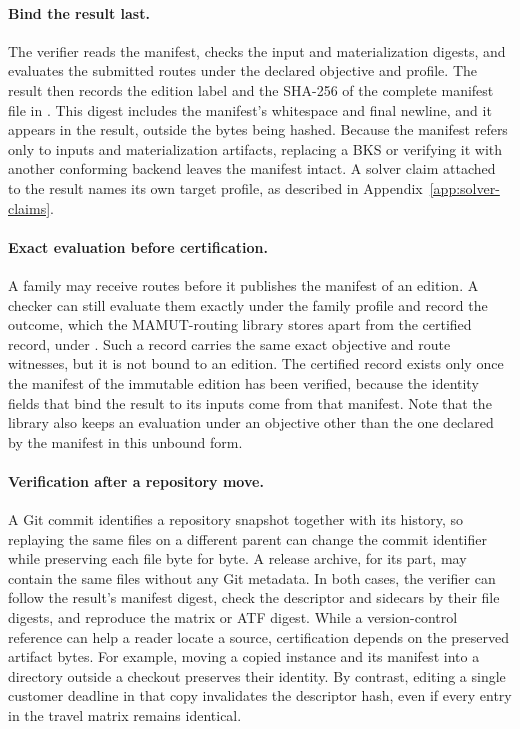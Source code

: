 \paragraph{Bind the result last.}
The verifier reads the manifest, checks the input and materialization digests, and evaluates the submitted routes under the declared objective and profile. The result then records the edition label and the SHA-256 of the complete manifest file in . This digest includes the manifest's whitespace and final newline, and it appears in the result, outside the bytes being hashed. Because the manifest refers only to inputs and materialization artifacts, replacing a BKS or verifying it with another conforming backend leaves the manifest intact. A solver claim attached to the result names its own target profile, as described in Appendix~\ref{app:solver-claims}.

\paragraph{Exact evaluation before certification.}
A family may receive routes before it publishes the manifest of an edition. A checker can still evaluate them exactly under the family profile and record the outcome, which the MAMUT-routing library stores apart from the certified record, under . Such a record carries the same exact objective and route witnesses, but it is not bound to an edition. The certified record  exists only once the manifest of the immutable edition has been verified, because the identity fields that bind the result to its inputs come from that manifest. Note that the library also keeps an evaluation under an objective other than the one declared by the manifest in this unbound form.

\paragraph{Verification after a repository move.}
A Git commit identifies a repository snapshot together with its history, so replaying the same files on a different parent can change the commit identifier while preserving each file byte for byte. A release archive, for its part, may contain the same files without any Git metadata. In both cases, the verifier can follow the result's manifest digest, check the descriptor and sidecars by their file digests, and reproduce the matrix or ATF digest. While a version-control reference can help a reader locate a source, certification depends on the preserved artifact bytes. For example, moving a copied instance and its manifest into a directory outside a checkout preserves their identity. By contrast, editing a single customer deadline in that copy invalidates the descriptor hash, even if every entry in the travel matrix remains identical.
